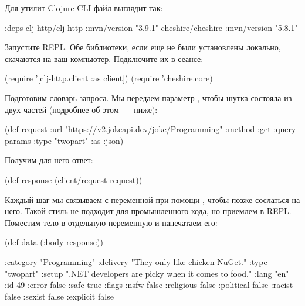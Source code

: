 Для утилит Clojure CLI файл  выглядит так:

\begin{english}
  \begin{clojure}
{:deps
 {clj-http/clj-http {:mvn/version "3.9.1"}
  cheshire/cheshire {:mvn/version "5.8.1"}}}
  \end{clojure}
\end{english}

Запустите REPL. Обе библиотеки, если еще не были установлены локально, скачаются на ваш компьютер. Подключите их в сеансе:

\begin{english}
  \begin{clojure}
(require '[clj-http.client :as client])
(require 'cheshire.core)
  \end{clojure}
\end{english}

Подготовим словарь запроса. Мы передаем параметр , чтобы шутка состояла из двух частей (подробнее об этом~--- ниже):

\begin{english}
  \begin{clojure}
(def request
  {:url "https://v2.jokeapi.dev/joke/Programming"
   :method :get
   :query-params {:type "twopart"}
   :as :json})
  \end{clojure}
\end{english}

Получим для него ответ:

\begin{english}
  \begin{clojure}
(def response
  (client/request request))
  \end{clojure}
\end{english}

Каждый шаг мы связываем с переменной при помощи , чтобы позже сослаться на него. Такой стиль не подходит для промышленного кода, но приемлем в REPL. Поместим тело в отдельную переменную и напечатаем его:

\begin{english}
  \begin{clojure}
(def data
  (:body response))

{:category "Programming"
 :delivery "They only like chicken NuGet."
 :type "twopart"
 :setup ".NET developers are picky when it comes to food."
 :lang "en"
 :id 49
 :error false
 :safe true
 :flags
 {:nsfw false
  :religious false
  :political false
  :racist false
  :sexist false
  :explicit false}}
  \end{clojure}
\end{english}

